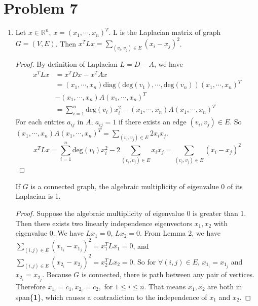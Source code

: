 \documentclass[twoside,11pt]{homework}
\begin{document}
\section*{Problem 7}
\begin{enumerate}
    \item 
    \begin{lemma}
    Let $x \in \mathbb{R}^n$, $x=(x_1, \cdots,x_n)^T$. L is the Laplacian matrix of graph $G = (V,E)$. Then $x^TLx=\sum_{(v_i,v_j)\in E} (x_i-x_j)^2$.
    \end{lemma}
    \begin{proof}
    By definition of Laplacian $L=D-A$, we have
    \begin{align*}
        x^TLx &= x^TDx - x^T Ax \\
        &= (x_1, \cdots,x_n) \text{diag}(\text{deg}(v_1), \cdots, \text{deg}(v_n))(x_1, \cdots,x_n)^T\\
        &-(x_1, \cdots,x_n)A(x_1, \cdots,x_n)^T\\
        &=\sum_{i=1}^n \text{deg}(v_i)x_i^2 - (x_1, \cdots,x_n)A(x_1, \cdots,x_n)^T
    \end{align*}
    For each entries $a_{ij}$ in $A$, $a_{ij}=1 $ if there exists an edge $(v_i,v_j) \in E$. \newline So $(x_1, \cdots,x_n)A(x_1, \cdots,x_n)^T = \sum_{(v_i,v_j)\in E} 2x_i x_j$.
    $$x^TLx = \sum_{i=1}^n \text{deg}(v_i)x_i^2 - 2\sum_{(v_i,v_j)\in E} x_i x_j = \sum_{(v_i,v_j)\in E}(x_i-x_j)^2$$
    \end{proof}
    \begin{lemma}
    If $G$ is a connected graph, the algebraic multiplicity of eigenvalue 0 of its Laplacian is 1.
    \end{lemma}
    \begin{proof}
    Suppose the algebraic multiplicity of eigenvalue 0 is greater than 1. Then there exists two linearly independence eigenvectors $x_1,x_2$ with eigenvalue 0. 
    We have $L x_1=0$, $L x_2=0$.
    From Lemma 2, we have $\sum_{(i,j)\in E} (x_{1_i} -x_{1_j})^2 = x_1^T L x_1=0$, and $\sum_{(i,j)\in E} (x_{2_i} -x_{2_j})^2 = x_2^T L x_2=0$. So for $\forall (i,j)\in E$, $x_{1_i} =x_{1_j}$ and $x_{2_i} =x_{2_j}$. Because $G$ is connected, there is path between any pair of vertices. Therefore $x_{1_i} = c_1, x_{2_i} = c_2,$ for $1 \leq i \leq n$. That means $x_1,x_2$ are both in span\{\textbf{1}\}, which causes a contradiction to the independence of $x_1$ and $x_2$.
    \end{proof}
    

\end{enumerate}
\end{document}
